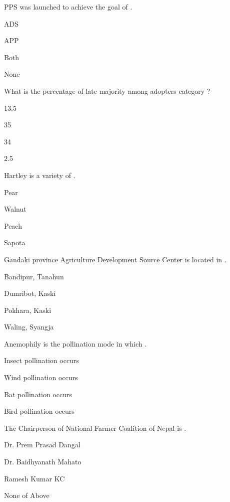 \begin{questions}
\question PPS was launched to achieve the goal of \fillin[][3cm].
\begin{items}
\item ADS
\item* APP
\item Both
\item None
\end{items}

\question What is the percentage of late majority among adopters category ?
\begin{items}
\item 13.5
\item 35
\item* 34
\item 2.5
\end{items}

\question Hartley is a variety of \fillin[][3cm].
\begin{items}
\item Pear
\item* Walnut
\item Peach
\item Sapota
\end{items}

\question Gandaki province Agriculture Development Source Center is located in \fillin[][3cm].
\begin{items}
\item Bandipur, Tanahun
\item Dumribot, Kaski
\item Pokhara, Kaski
\item* Waling, Syangja
\end{items}

\question Anemophily is the pollination mode in which \fillin[][3cm].
\begin{items}
\item Insect pollination occurs
\item* Wind pollination occurs
\item Bat pollination occurs
\item Bird pollination occurs
\end{items}

\question The Chairperson of National Farmer Coalition of Nepal is \fillin[][3cm].
\begin{items}
\item* Dr. Prem Prasad Dangal
\item Dr. Baidhyanath Mahato
\item Ramesh Kumar KC
\item None of Above
\end{items}


\end{questions}
